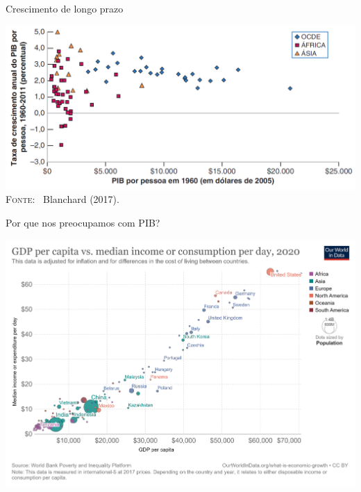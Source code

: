 \documentclass[10pt]{beamer}
\begin{document}
\begin{frame}{Crescimento de longo prazo}
    \begin{center}
        \begin{minipage}[b]{0.9\textwidth}
            \includegraphics[width=\textwidth]{./figures/conv nocde.PNG}\\
            \tiny{{\scshape Fonte}: \ Blanchard (2017).}
        \end{minipage}
    \end{center}
\end{frame}

\begin{frame}{Por que nos preocupamos com PIB?}
    \begin{center}
        \begin{minipage}[b]{.7\textwidth}
            \href{https://ourworldindata.org/grapher/median-daily-per-capita-expenditure-vs-gdp-per-capita}{\includegraphics[width=\textwidth]{./figures/gdp x consumption.png}}
        \end{minipage}
    \end{center}
\end{frame}
\end{document}

